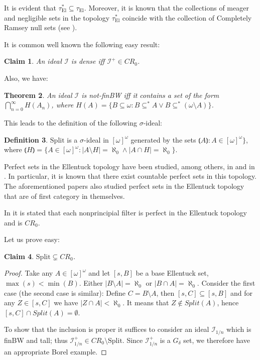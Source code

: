 \documentclass[12pt]{amsart}
\theoremstyle{plain}
\newtheorem{theorem}{Theorem}[section]
\newtheorem{claim}[theorem]{Claim}
\theoremstyle{definition}
\newtheorem{definition}[theorem]{Definition}
\theoremstyle{remark}
\newcommand{\infsub}{[\omega]^{\omega}}
\newcommand{\calI}{\mathcal{I}}
\newcommand{\cI}{\mathcal{I}}
\newcommand{\idealHarmonicznyVar}{\cI_{1/n}}
\newcommand{\EllentuckTopology}{\tau_\mathrm{El}}
\newcommand{\EllentuckTopologyStar}{\EllentuckTopology^*}
\newcommand{\Split}{\mathrm{Split}}
\newcommand{\lNawiasik}{\lParen}
\newcommand{\rNawiasik}{\rParen}
\begin{document}
It is evident that $\EllentuckTopologyStar \subseteq \EllentuckTopology$.
Moreover, it is known that the collections of meager and negligible
sets in the topology $\EllentuckTopologyStar$
coincide with the collection of Completely Ramsey null sets
(see \cite{Plewik1987}).

It is common well known the following easy result:
\begin{claim}
An ideał $\calI$ is dense iff $\calI^+ \in CR_0$.
\end{claim}

Also, we have: 
\begin{theorem}
  An ideal $\calI$ is not-finBW iff it contains a set of the form
  \linebreak
$\bigcap_{n=0}^\infty H(A_n)$, where
 $H(A) = \lbrace B \subseteq \omega \colon B \subseteq^* A \vee B \subseteq^* (\omega\setminus A)\rbrace$.
\end{theorem}

This leads to the definition of the following $\sigma$-ideal:

\begin{definition}
$\mathrm{Split}$ is a $\sigma$-ideal in
$\infsub$ generated by the sets
  \linebreak $\lNawiasik A \rNawiasik \colon A \in \infsub \rbrace$,
where  
$\lNawiasik H \rNawiasik = 
\lbrace A \in \infsub \colon |A \setminus H| = \aleph_0 \wedge |A \cap H| = \aleph_0\rbrace$.
\end{definition}

Perfect sets in the Ellentuck topology have been studied,
among others, in \cite{Reardon1996} and in \cite{NowikReardon2003}.
In particular, it is known that there exist countable perfect sets in this topology.
The aforementioned papers also studied perfect sets in the Ellentuck topology
that are of first category in themselves.

In \cite{NowikReardon2003} it is stated that each nonprincipial filter is
perfect in the Ellentuck topology and is $CR_0$.

Let us prove easy:
\begin{claim}
  $\Split\subsetneq CR_0$.
\end{claim}
\begin{proof}
  Take any $A \in \infsub$ and let $[s, B]$ be a base Ellentuck set, $\max(s) < \min(B)$.
Either $|B \setminus A| = \aleph_0$ or $|B \cap A| = \aleph_0$.
Consider the first case (the second case is similar): Define $C = B \setminus A$, 
then $[s, C] \subseteq [s, B]$ and for any $Z \in [s, C]$ we have
$|Z \cap A| < \aleph_0$. It means that
$Z \not\in \mathit{Split}(A)$, hence $[s, C] \cap \mathit{Split}(A) = \emptyset$.

To show that the inclusion is proper it suffices to consider an ideal 
$\idealHarmonicznyVar$ which is finBW and tall; thus 
$\idealHarmonicznyVar^+ \in CR_0 \setminus \mathrm{Split}$. Since 
$\idealHarmonicznyVar^+$ is a $G_\delta$ set, we therefore have an appropriate Borel example.
\end{proof}
\end{document}
